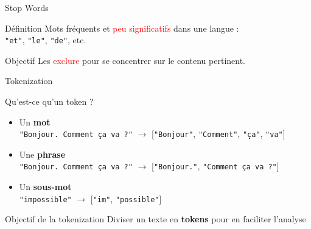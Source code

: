 \begin{frame}{Stop Words}

    \begin{block}{Définition}
        \smallskip
        Mots fréquents et \textcolor{red}{peu significatifs} dans une langue :\\\texttt{"et"}, \texttt{"le"}, \texttt{"de"}, etc.
    \end{block}

    \bigskip

    \begin{block}{Objectif}
        \smallskip
       Les \textcolor{red}{exclure} pour se concentrer sur le contenu pertinent.
    \end{block}
\end{frame}

\begin{frame}{Tokenization}
    \begin{block}{Qu'est-ce qu'un token ?}
        \smallskip
        \begin{itemize}
            \item Un \textbf{mot}\\
            {\footnotesize \texttt{"Bonjour. Comment ça va ?"} $\rightarrow$ [\texttt{"Bonjour"}, \texttt{"Comment"}, \texttt{"ça"}, \texttt{"va"}]}
            \item Une \textbf{phrase}\\
            {\footnotesize \texttt{"Bonjour. Comment ça va ?"} $\rightarrow$ [\texttt{"Bonjour."}, \texttt{"Comment ça va ?"}]}
            \item Un \textbf{sous-mot}\\
            {\footnotesize \texttt{"impossible"} $\rightarrow$ [\texttt{"im"}, \texttt{"possible"}]}
        \end{itemize}
        
    \end{block}
    
    \bigskip
    
    \begin{block}{Objectif de la tokenization}
        \smallskip
        Diviser un texte en \textbf{tokens} pour en faciliter l'analyse
    \end{block}
\end{frame}




